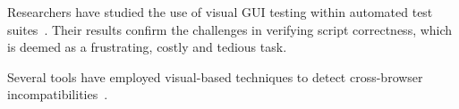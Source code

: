 Researchers have studied the use of visual GUI testing within automated test suites~\cite{Alegroth2017,Alegroth:2015:VGT:2780084.2780169,Alegroth:2016:MAT:2905389.2905646}. Their results confirm the challenges in verifying script correctness, which is deemed as a frustrating, costly and tedious task. 

Several tools have employed visual-based techniques to detect cross-browser incompatibilities~\cite{RoyChoudhary:2013:XAI:2486788.2486881,RoyChoudhary:2010:WAI:1912607.1913287,7102638}.

